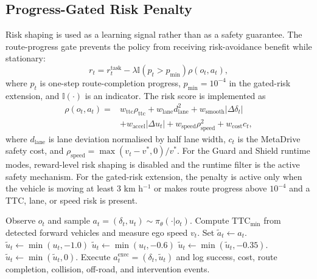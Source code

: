 \documentclass[conference,a4paper]{IEEEtran}
\newcommand{\method}{GuardShield-Runtime}
\begin{document}
\subsection{Progress-Gated Risk Penalty}
Risk shaping is used as a learning signal rather than as a safety guarantee. The route-progress gate prevents the policy from receiving risk-avoidance benefit while stationary:
\begin{equation}
 r_t = r_t^{\mathrm{task}} - \lambda \mathbb{I}(p_t > p_{\min})\rho(o_t,a_t),
 \label{eq:gated-risk}
\end{equation}
where $p_t$ is one-step route-completion progress, $p_{\min}=10^{-4}$ in the gated-risk extension, and $\mathbb{I}(\cdot)$ is an indicator. The risk score is implemented as
\begin{equation}
\begin{aligned}
 \rho(o_t,a_t) ={}& w_{\mathrm{ttc}}\rho_{\mathrm{ttc}} + w_{\mathrm{lane}}d_{\mathrm{lane}}^2 + w_{\mathrm{smooth}}|\Delta\delta_t| \\
 &+ w_{\mathrm{accel}}|\Delta u_t| + w_{\mathrm{speed}}\rho_{\mathrm{speed}}^2 + w_{\mathrm{cost}}c_t,
\end{aligned}
\label{eq:risk-score}
\end{equation}
where $d_{\mathrm{lane}}$ is lane deviation normalised by half lane width, $c_t$ is the MetaDrive safety cost, and $\rho_{\mathrm{speed}}=\max(v_t-v^*,0)/v^*$. For the Guard and Shield runtime modes, reward-level risk shaping is disabled and the runtime filter is the active safety mechanism. For the gated-risk extension, the penalty is active only when the vehicle is moving at least 3 km h$^{-1}$ or makes route progress above $10^{-4}$ and a TTC, lane, or speed risk is present.

\begin{algorithm}[t]
\caption{\method{} execution step}
\label{alg:guardshield}
\begin{algorithmic}[1]
\State Observe $o_t$ and sample $a_t=(\delta_t,u_t)\sim\pi_\theta(\cdot|o_t)$.
\State Compute $\mathrm{TTC}_{\min}$ from detected forward vehicles and measure ego speed $v_t$.
\State Set $\tilde a_t\leftarrow a_t$.
    \State $\tilde u_t\leftarrow \min(u_t,-1.0)$ 
    \State $\tilde u_t\leftarrow \min(u_t,-0.6)$ 
\EndIf
{}
    \State $\tilde u_t\leftarrow \min(\tilde u_t,-0.35)$.
    \State $\tilde u_t\leftarrow \min(\tilde u_t,0)$.
\EndIf
\State Execute $a_t^{\mathrm{exec}}=(\delta_t,\tilde u_t)$ and log success, cost, route completion, collision, off-road, and intervention events.
\end{algorithmic}
\end{algorithm}
\end{document}
